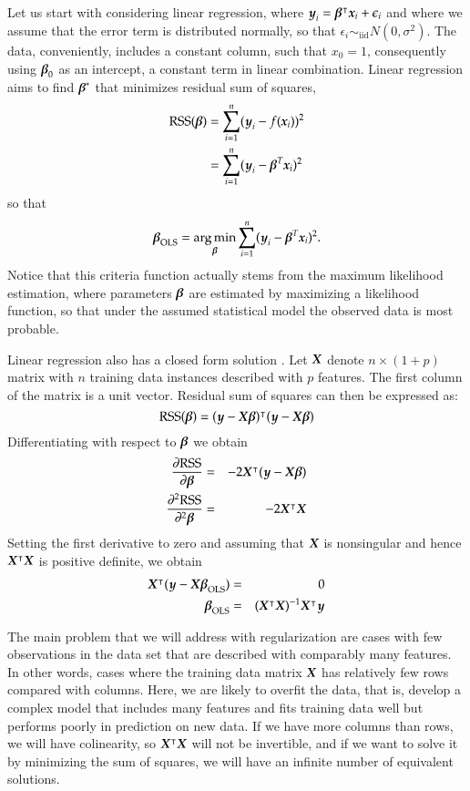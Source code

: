 \begin{refsection}

Let us start with considering linear regression, where $\boldsymbol{y}_i = \boldsymbol{\beta}^\intercal \boldsymbol{x}_i + \epsilon_i$ and where we assume that the error term is distributed normally, so that $\epsilon_i \sim_\text{iid} N(0, \sigma^2)$. The data, conveniently, includes a constant column, such that $x_0=1$, consequently using $\boldsymbol{\beta}_0$ as an intercept, a constant term in linear combination. Linear regression aims to find $\boldsymbol{\beta}^*$ that minimizes residual sum of squares,
\begin{align*}
{\rm RSS}(\boldsymbol{\beta}) & = \sum_{i=1}^n (\boldsymbol{y}_i-f(\boldsymbol{x}_i))^2 \\
& = \sum_{i=1}^n (\boldsymbol{y}_i - \boldsymbol{\beta}^T\boldsymbol{x}_i)^2 
\end{align*}
so that
$$\boldsymbol{\beta}_{\rm OLS} = \operatorname*{arg\,min}_{\boldsymbol{\beta}} \sum_{i=1}^n (\boldsymbol{y}_i - \boldsymbol{\beta}^T\boldsymbol{x}_i)^2.$$
Notice that this criteria function actually stems from the maximum likelihood estimation, where parameters $\boldsymbol{\beta}$ are estimated by maximizing a likelihood function, so that under the assumed statistical model the observed data is most probable.

Linear regression also has a closed form solution \citep{ESL}. Let $\boldsymbol{X}$ denote $n\times (1+p)$ matrix with $n$ training data instances described with $p$ features. The first column of the matrix is a unit vector. Residual sum of squares can then be expressed as:
$$
{\rm RSS}(\boldsymbol{\beta}) = (\boldsymbol{y}-\boldsymbol{X}\boldsymbol{\beta})^\intercal (\boldsymbol{y}-\boldsymbol{X}\boldsymbol{\beta})
$$
Differentiating with respect to $\boldsymbol{\beta}$ we obtain 
\begin{eqnarray*}
\frac{\partial{\rm RSS}}{\partial \boldsymbol{\beta}} & = & -2\boldsymbol{X}^\intercal (\boldsymbol{y} - \boldsymbol{X}\boldsymbol{\beta}) \\
\frac{\partial^2{\rm RSS}}{\partial^2\boldsymbol{\beta}} & = & -2\boldsymbol{X}^\intercal\boldsymbol{X}
\end{eqnarray*}
Setting the first derivative to zero and assuming that $\boldsymbol{X}$ is nonsingular and hence $\boldsymbol{X}^\intercal\boldsymbol{X}$ is positive definite, we obtain
\begin{eqnarray*}
\boldsymbol{X}^\intercal (\boldsymbol{y} - \boldsymbol{X}\boldsymbol{\beta}_{\rm OLS}) & = & 0 \\
\boldsymbol{\beta}_{\rm OLS} & = & (\boldsymbol{X}^\intercal\boldsymbol{X})^{-1}\boldsymbol{X}^\intercal\boldsymbol{y}
\end{eqnarray*}

The main problem that we will address with regularization are cases with few observations in the data set that are described with comparably many features. In other words, cases where the training data matrix $\boldsymbol{X}$ has relatively few rows compared with columns. Here, we are likely to overfit the data, that is, develop a complex model that includes many features and fits training data well but performs poorly in prediction on new data. If we have more columns than rows, we will have colinearity, so $\boldsymbol{X}^\intercal\boldsymbol{X}$ will not be invertible, and if we want to solve it by minimizing the sum of squares, we will have an infinite number of equivalent solutions.


\end{refsection}

